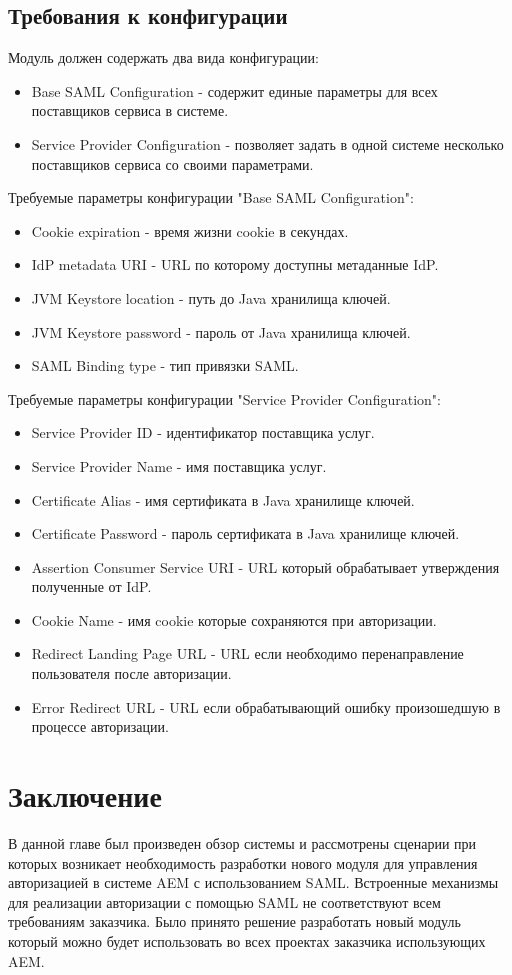 \subsection{Требования к конфигурации}
Модуль должен содержать два вида конфигурации:
\begin{itemize}
\item Base SAML Configuration - содержит единые параметры для всех поставщиков сервиса в системе.
\item Service Provider Configuration - позволяет задать в одной системе несколько поставщиков сервиса со своими параметрами. 
\end{itemize}

Требуемые параметры конфигурации "Base SAML Configuration":
\begin{itemize}
\item Cookie expiration - время жизни cookie в секундах.
\item IdP metadata URI - URL по которому доступны метаданные IdP.
\item JVM Keystore location - путь до Java хранилища ключей.
\item JVM Keystore password - пароль от Java хранилища ключей.
\item SAML Binding type - тип привязки SAML.
\end{itemize}

Требуемые параметры конфигурации "Service Provider Configuration":
\begin{itemize}
\item Service Provider ID - идентификатор поставщика услуг.
\item Service Provider Name - имя поставщика услуг.
\item Certificate Alias - имя сертификата в Java хранилище ключей.
\item Certificate Password - пароль сертификата в Java хранилище ключей.
\item Assertion Consumer Service URI - URL который обрабатывает утверждения полученные от IdP.
\item Cookie Name - имя cookie которые сохраняются при авторизации.
\item Redirect Landing Page URL - URL если необходимо перенаправление пользователя после авторизации.
\item Error Redirect URL - URL если обрабатывающий ошибку произошедшую в процессе авторизации.
\end{itemize}

\section{Заключение}
В данной главе был произведен обзор системы и рассмотрены сценарии при которых возникает необходимость разработки нового модуля для управления авторизацией в системе AEM с использованием SAML. Встроенные механизмы для реализации авторизации с помощью SAML не соответствуют всем требованиям заказчика. Было принято решение разработать новый модуль который можно будет использовать во всех проектах заказчика использующих AEM.


